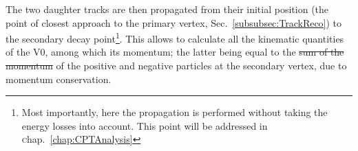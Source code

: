 \documentclass[ALICE,manyauthors]{cernphprep}
\newcommand{\chap}      {\textsc{c}hap.~}
\newcommand{\Sec}       {\textsc{S}ec.~}
\providecommand{\DIFaddtex}[1]{{\protect\color{blue}\uwave{#1}}} %
\providecommand{\DIFdeltex}[1]{{\protect\color{red}\sout{#1}}}                      %
\providecommand{\DIFaddbegin}{} %
\providecommand{\DIFaddend}{} %
\providecommand{\DIFdelbegin}{} %
\providecommand{\DIFdelend}{} %
\providecommand{\DIFadd}[1]{\texorpdfstring{\DIFaddtex{#1}}{#1}} %
\providecommand{\DIFdel}[1]{\texorpdfstring{\DIFdeltex{#1}}{}} %
\newcommand{\DIFscaledelfig}{0.5}
\newlength{\DIFdelgraphicswidth} %
\newlength{\DIFdelgraphicsheight} %
\newcommand{\DIFaddincludegraphics}[2][]{{\color{blue}\fbox{\DIFOincludegraphics[#1]{#2}}}} %
\newcommand{\DIFdelincludegraphics}[2][]{%
\sbox{\DIFdelgraphicsbox}{\DIFOincludegraphics[#1]{#2}}%
\settoboxwidth{\DIFdelgraphicswidth}{\DIFdelgraphicsbox} %
\settoboxtotalheight{\DIFdelgraphicsheight}{\DIFdelgraphicsbox} %
\scalebox{\DIFscaledelfig}{%
\parbox[b]{\DIFdelgraphicswidth}{\usebox{\DIFdelgraphicsbox}\\[-\baselineskip] \rule{\DIFdelgraphicswidth}{0em}}\llap{\resizebox{\DIFdelgraphicswidth}{\DIFdelgraphicsheight}{%
\setlength{\unitlength}{\DIFdelgraphicswidth}%
\begin{picture}(1,1)%
\thicklines\linethickness{2pt} %
{\color[rgb]{1,0,0}\put(0,0){\framebox(1,1){}}}%
{\color[rgb]{1,0,0}\put(0,0){\line( 1,1){1}}}%
{\color[rgb]{1,0,0}\put(0,1){\line(1,-1){1}}}%
\end{picture}%
}\hspace*{3pt}}} %
} %
\DeclareRobustCommand{\DIFaddbegin}{\DIFOaddbegin \let\includegraphics\DIFaddincludegraphics} %
\DeclareRobustCommand{\DIFaddend}{\DIFOaddend \let\includegraphics\DIFOincludegraphics} %
\DeclareRobustCommand{\DIFdelbegin}{\DIFOdelbegin \let\includegraphics\DIFdelincludegraphics} %
\DeclareRobustCommand{\DIFdelend}{\DIFOaddend \let\includegraphics\DIFOincludegraphics} %
\begin{document}

The two daughter tracks are then propagated from their initial position (the point of closest approach to the primary vertex, \Sec\ref{subsubsec:TrackReco}) to the secondary decay point\footnote{Most importantly, here the propagation is performed without taking the energy losses into account. This point will be addressed in \chap\ref{chap:CPTAnalysis}}. This allows to calculate all the kinematic quantities of the V0, among which its momentum; the latter being equal to the \DIFdelbegin \DIFdel{sum of the momentum }\DIFdelend \DIFaddbegin \DIFadd{momentum sum }\DIFaddend of the positive and negative particles at the secondary vertex, due to momentum conservation.
\end{document}
